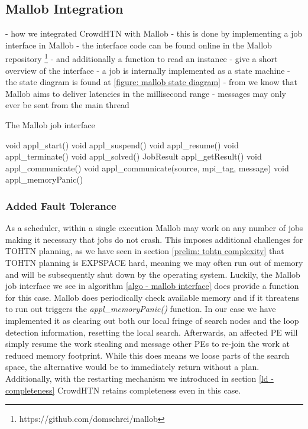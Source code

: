 \subsection{Mallob Integration}
- how we integrated CrowdHTN with Mallob
- this is done by implementing a job interface in Mallob
- the interface code can be found online in the Mallob repository \footnote{https://github.com/domschrei/mallob}
- and additionally a function to read an instance
- give a short overview of the interface
- a job is internally implemented as a state machine
- the state diagram is found at \ref{figure: mallob state diagram}
- from \cite{schreiber2021scalable} we know that Mallob aims to deliver latencies in the millisecond range
- messages may only ever be sent from the main thread

\begin{algorithm}
	\caption{The Mallob job interface}
	\label{algo - mallob interface}
	void appl\_start()\;
	void appl\_suspend()\;
	void appl\_resume()\;
	void appl\_terminate()\;
	void appl\_solved()\;
	JobResult appl\_getResult()\;
	void appl\_communicate()\;
	void appl\_communicate(source, mpi\_tag, message)\;
	void appl\_memoryPanic()\;
\end{algorithm}

\subsubsection{Added Fault Tolerance}
As a scheduler, within a single execution Mallob may work on any number of jobs making it necessary that jobs do not crash. This imposes additional challenges for TOHTN planning, as we have seen in section \ref{prelim: tohtn complexity} that TOHTN planning is EXPSPACE hard, meaning we may often run out of memory and will be subsequently shut down by the operating system. Luckily, the Mallob job interface we see in algorithm \ref{algo - mallob interface} does provide a function for this case. Mallob does periodically check available memory and if it threatens to run out triggers the \textit{appl\_memoryPanic()} function. In our case we have implemented it as clearing out both our local fringe of search nodes and the loop detection information, resetting the local search. Afterwards, an affected PE will simply resume the work stealing and message other PEs to re-join the work at reduced memory footprint. While this does means we loose parts of the search space, the alternative would be to immediately return without a plan. Additionally, with the restarting mechanism we introduced in section \ref{ld - completeness} CrowdHTN retains completeness even in this case.

